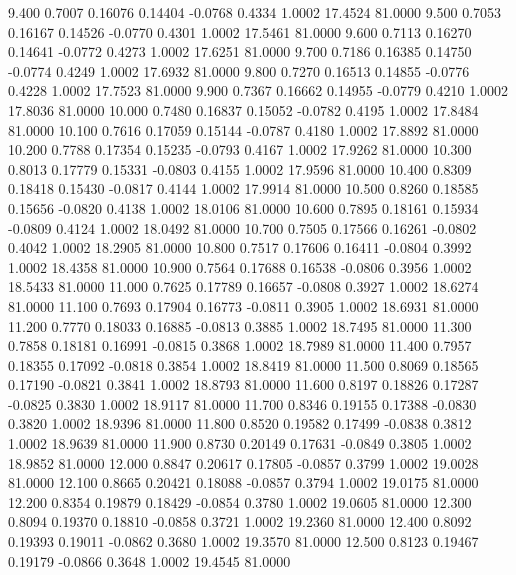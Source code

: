    9.400   0.7007   0.16076   0.14404  -0.0768   0.4334   1.0002  17.4524  81.0000
   9.500   0.7053   0.16167   0.14526  -0.0770   0.4301   1.0002  17.5461  81.0000
   9.600   0.7113   0.16270   0.14641  -0.0772   0.4273   1.0002  17.6251  81.0000
   9.700   0.7186   0.16385   0.14750  -0.0774   0.4249   1.0002  17.6932  81.0000
   9.800   0.7270   0.16513   0.14855  -0.0776   0.4228   1.0002  17.7523  81.0000
   9.900   0.7367   0.16662   0.14955  -0.0779   0.4210   1.0002  17.8036  81.0000
  10.000   0.7480   0.16837   0.15052  -0.0782   0.4195   1.0002  17.8484  81.0000
  10.100   0.7616   0.17059   0.15144  -0.0787   0.4180   1.0002  17.8892  81.0000
  10.200   0.7788   0.17354   0.15235  -0.0793   0.4167   1.0002  17.9262  81.0000
  10.300   0.8013   0.17779   0.15331  -0.0803   0.4155   1.0002  17.9596  81.0000
  10.400   0.8309   0.18418   0.15430  -0.0817   0.4144   1.0002  17.9914  81.0000
  10.500   0.8260   0.18585   0.15656  -0.0820   0.4138   1.0002  18.0106  81.0000
  10.600   0.7895   0.18161   0.15934  -0.0809   0.4124   1.0002  18.0492  81.0000
  10.700   0.7505   0.17566   0.16261  -0.0802   0.4042   1.0002  18.2905  81.0000
  10.800   0.7517   0.17606   0.16411  -0.0804   0.3992   1.0002  18.4358  81.0000
  10.900   0.7564   0.17688   0.16538  -0.0806   0.3956   1.0002  18.5433  81.0000
  11.000   0.7625   0.17789   0.16657  -0.0808   0.3927   1.0002  18.6274  81.0000
  11.100   0.7693   0.17904   0.16773  -0.0811   0.3905   1.0002  18.6931  81.0000
  11.200   0.7770   0.18033   0.16885  -0.0813   0.3885   1.0002  18.7495  81.0000
  11.300   0.7858   0.18181   0.16991  -0.0815   0.3868   1.0002  18.7989  81.0000
  11.400   0.7957   0.18355   0.17092  -0.0818   0.3854   1.0002  18.8419  81.0000
  11.500   0.8069   0.18565   0.17190  -0.0821   0.3841   1.0002  18.8793  81.0000
  11.600   0.8197   0.18826   0.17287  -0.0825   0.3830   1.0002  18.9117  81.0000
  11.700   0.8346   0.19155   0.17388  -0.0830   0.3820   1.0002  18.9396  81.0000
  11.800   0.8520   0.19582   0.17499  -0.0838   0.3812   1.0002  18.9639  81.0000
  11.900   0.8730   0.20149   0.17631  -0.0849   0.3805   1.0002  18.9852  81.0000
  12.000   0.8847   0.20617   0.17805  -0.0857   0.3799   1.0002  19.0028  81.0000
  12.100   0.8665   0.20421   0.18088  -0.0857   0.3794   1.0002  19.0175  81.0000
  12.200   0.8354   0.19879   0.18429  -0.0854   0.3780   1.0002  19.0605  81.0000
  12.300   0.8094   0.19370   0.18810  -0.0858   0.3721   1.0002  19.2360  81.0000
  12.400   0.8092   0.19393   0.19011  -0.0862   0.3680   1.0002  19.3570  81.0000
  12.500   0.8123   0.19467   0.19179  -0.0866   0.3648   1.0002  19.4545  81.0000
